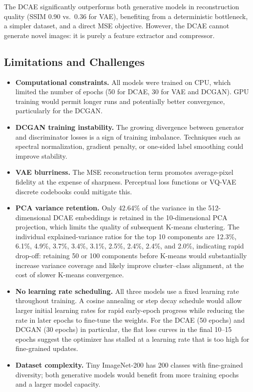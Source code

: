 \documentclass[12pt]{article}
\begin{document}
The DCAE significantly outperforms both generative models in reconstruction quality (SSIM 0.90 vs.\ 0.36 for VAE), benefiting from a deterministic bottleneck, a simpler dataset, and a direct MSE objective. However, the DCAE cannot generate novel images: it is purely a feature extractor and compressor.

\subsection{Limitations and Challenges}

\begin{itemize}
    \item \textbf{Computational constraints.} All models were trained on CPU, which limited the number of epochs (50 for DCAE, 30 for VAE and DCGAN). GPU training would permit longer runs and potentially better convergence, particularly for the DCGAN.
    \item \textbf{DCGAN training instability.} The growing divergence between generator and discriminator losses is a sign of training imbalance. Techniques such as spectral normalization, gradient penalty, or one-sided label smoothing could improve stability.
    \item \textbf{VAE blurriness.} The MSE reconstruction term promotes average-pixel fidelity at the expense of sharpness. Perceptual loss functions or VQ-VAE discrete codebooks could mitigate this.
    \item \textbf{PCA variance retention.} Only 42.64\% of the variance in the 512-dimensional DCAE embeddings is retained in the 10-dimensional PCA projection, which limits the quality of subsequent K-means clustering. The individual explained-variance ratios for the top 10 components are 12.3\%, 6.1\%, 4.9\%, 3.7\%, 3.4\%, 3.1\%, 2.5\%, 2.4\%, 2.4\%, and 2.0\%, indicating rapid drop-off: retaining 50 or 100 components before K-means would substantially increase variance coverage and likely improve cluster--class alignment, at the cost of slower K-means convergence.
    \item \textbf{No learning rate scheduling.} All three models use a fixed learning rate throughout training. A cosine annealing or step decay schedule would allow larger initial learning rates for rapid early-epoch progress while reducing the rate in later epochs to fine-tune the weights. For the DCAE (50 epochs) and DCGAN (30 epochs) in particular, the flat loss curves in the final 10–15 epochs suggest the optimizer has stalled at a learning rate that is too high for fine-grained updates.
    \item \textbf{Dataset complexity.} Tiny ImageNet-200 has 200 classes with fine-grained diversity; both generative models would benefit from more training epochs and a larger model capacity.
\end{itemize}
\end{document}
